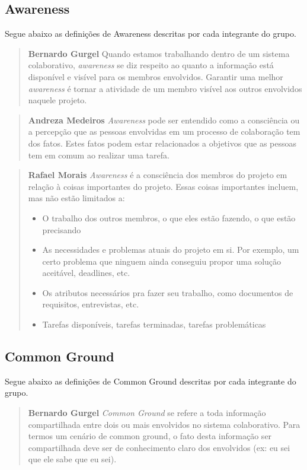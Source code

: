 \documentclass{acm_proc_article-sp}
\begin{document}
\subsection{Awareness}
Segue abaixo as definições de Awareness descritas por cada integrante do grupo.

\begin{quote}\textbf{Bernardo Gurgel}
Quando estamos trabalhando dentro de um sistema colaborativo, \textsl{awareness} se diz
respeito ao quanto a informação está disponível e visível para os membros envolvidos.
Garantir uma melhor \textsl{awareness} é tornar a atividade de um membro visível aos outros envolvidos naquele projeto.
\end{quote}

\begin{quote}\textbf{Andreza Medeiros}
\textsl{Awareness} pode ser entendido como a consciência ou a percepção que as pessoas envolvidas em um processo de colaboração tem dos fatos. Estes fatos podem estar relacionados a objetivos que as pessoas tem em comum ao realizar uma tarefa.
\end{quote}

\begin{quote}\textbf{Rafael Morais}
  \textsl{Awareness} é a consciência dos membros do projeto em relação à coisas importantes do projeto.
  Essas coisas importantes incluem, mas não estão limitados a:
  \begin{itemize}
    \item O trabalho dos outros membros, o que eles estão fazendo, o que estão precisando
    \item As necessidades e problemas atuais do projeto em si. Por exemplo, um certo problema
      que ninguem ainda conseguiu propor uma solução aceitável, deadlines, etc.
    \item Os atributos necessários pra fazer seu trabalho, como documentos de requisitos, entrevistas, etc.
    \item Tarefas disponíveis, tarefas terminadas, tarefas problemáticas
  \end{itemize}
\end{quote}

\subsection{Common Ground}
Segue abaixo as definições de Common Ground descritas por cada integrante do grupo.

\begin{quote}\textbf{Bernardo Gurgel}
  \textsl{Common Ground} se refere a toda informação compartilhada entre dois ou mais envolvidos no sistema colaborativo.
  Para termos um cenário de common ground, o fato desta informação ser compartilhada deve ser de conhecimento
  claro dos envolvidos (ex: eu sei que ele sabe que eu sei).
\end{quote}
\end{document}
